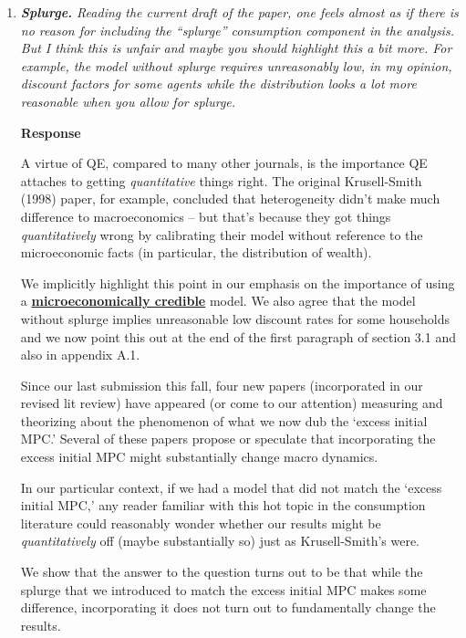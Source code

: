 \documentclass[12pt,letterpaper,english]{article}
\begin{document}
\begin{enumerate}
	
\item \textit{\textbf{Splurge.} Reading the current draft of the paper, one feels almost as if there is	no reason for including the ``splurge'' consumption component in the analysis. But I think this is unfair and maybe you should highlight this a bit more. For example, the model without splurge requires unreasonably low, in my opinion, discount factors	for some agents while the distribution looks a lot more reasonable when you allow for splurge.}

  \noindent \textbf{Response}

  A virtue of QE, compared to many other journals, is the importance QE attaches to getting \textit{quantitative} things right.  The original Krusell-Smith (1998) paper, for example, concluded that heterogeneity didn't make much difference to macroeconomics -- but that's because they got things \textit{quantitatively} wrong by calibrating their model without reference to the microeconomic facts (in particular, the distribution of wealth).

  We implicitly highlight this point in our emphasis on the importance of using a \href{https://llorracc.github.io/HAFiscal/#microeconomically-credible}{\textbf{microeconomically credible}} model. We also agree that the model without splurge implies unreasonable low discount rates for some households and we now point this out at the end of the first paragraph of section 3.1 and also in appendix A.1.

  Since our last submission this fall, four new papers (incorporated in our revised lit review) have appeared (or come to our attention) measuring and theorizing about the phenomenon of what we now dub the `excess initial MPC.'  Several of these papers propose or speculate that incorporating the excess initial MPC might substantially change macro dynamics.

  In our particular context, if we had a model that did not match the `excess initial MPC,' any reader familiar with this hot topic in the consumption literature could reasonably wonder whether our results might be \textit{quantitatively} off (maybe substantially so) just as Krusell-Smith's were.

  We show that the answer to the question turns out to be that while the splurge that we introduced to match the excess initial MPC makes some difference, incorporating it does not turn out to fundamentally change the results.


\end{enumerate}
\end{document}
